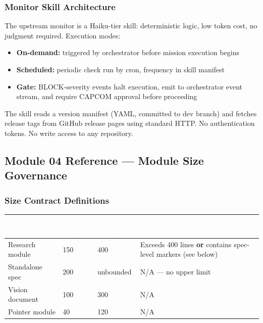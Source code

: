 \documentclass[11pt,letterpaper]{article}
\newcommand{\tableheader}[1]{\textbf{\sffamily\textcolor{white}{#1}}}
\begin{document}
\subsubsection{Monitor Skill Architecture}

The upstream monitor is a Haiku-tier skill: deterministic logic, low token cost, no judgment required. Execution modes:

\begin{itemize}[noitemsep]
  \item \textbf{On-demand:} triggered by orchestrator before mission execution begins
  \item \textbf{Scheduled:} periodic check run by cron, frequency in skill manifest
  \item \textbf{Gate:} BLOCK-severity events halt execution, emit to orchestrator event stream, and require CAPCOM approval before proceeding
\end{itemize}

The skill reads a version manifest (YAML, committed to dev branch) and fetches release tags from GitHub release pages using standard HTTP. No authentication tokens. No write access to any repository.

\subsection{Module 04 Reference --- Module Size Governance}

\subsubsection{Size Contract Definitions}

\begin{center}
\begin{tabularx}{\textwidth}{L{3.5cm}C{2cm}C{2cm}X}
\toprule
{}
\tableheader{Document Class} & \tableheader{Min Lines} & \tableheader{Max Lines} & \tableheader{Promotion Trigger} \\
\midrule
Research module & 150 & 400 & Exceeds 400 lines \textbf{or} contains spec-level markers (see below) \\
Standalone spec & 200 & unbounded & N/A --- no upper limit \\
Vision document & 100 & 300 & N/A \\
Pointer module & 40 & 120 & N/A \\
\bottomrule
\end{tabularx}
\end{center}
\end{document}
